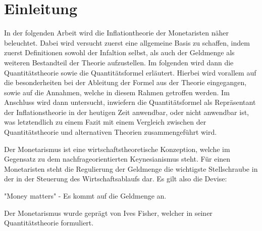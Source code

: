 \documentclass[
	12pt,
	BCOR=5mm,
	DIV=12,
	headinclude=on,
	footinclude=off,
	parskip=half,
	bibliography=totoc,
	listof=entryprefix,
	toc=listof,
	numbers=noenddot,
]{scrreprt}
\begin{document}


\tableofcontents

\listoffigures


\chapter{Einleitung}

\ihead{\chaptername~\thechapter}

In der folgenden Arbeit wird die Inflationtheorie der Monetaristen näher beleuchtet. Dabei wird versucht zuerst eine allgemeine Basis zu schaffen, indem zuerst Definitionen sowohl der Infaltion selbst, als auch der Geldmenge als weiteren Bestandteil der Theorie aufzustellen. Im folgenden wird dann die Quantitätstheorie sowie die Quantitätsformel erläutert. Hierbei wird vorallem auf die besonderheiten bei der Ableitung der Formel aus der Theorie eingegangen, sowie auf die Annahmen, welche in diesem Rahmen getroffen werden. Im Anschluss wird dann untersucht, inwiefern die Quantitätsformel als Repräsentant der Inflationstheorie in der heutigen Zeit anwendbar, oder nicht anwendbar ist, was letztendlich zu einem Fazit mit einem Vergleich zwischen der Quantitätstheorie und alternativen Theorien zusammengeführt wird.

Der Monetarismus ist eine wirtschaftstheoretische Konzeption, welche im Gegensatz zu dem nachfrageorientierten Keynesianismus steht. Für einen Monetaristen steht die Regulierung der Geldmenge die wichtigste Stellschraube in der in der Steuerung des Wirtschaftsablaufs dar. Es gilt also die Devise:

\begin{center}
    "Money matters" - Es kommt auf die Geldmenge an.
\end{center}

Der Monetarismus wurde geprägt von Ives Fisher, welcher in seiner Quantitätstheorie formuliert.



\printbibliography[title=Literaturverzeichnis]
\end{document}
